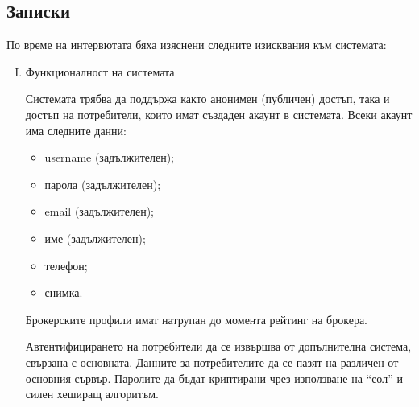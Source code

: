 \documentclass[]{article}
\begin{document}
\subsection*{Записки}
По време на интервютата бяха изяснени следните изисквания към системата:
\begin{enumerate}[I.]
\item {Функционалност на системата


Системата трябва да поддържа както анонимен (публичен) достъп, така и достъп на потребители, които имат създаден акаунт в системата. Всеки акаунт има следните данни:
	\begin{itemize}
	\item username (задължителен);
	\item парола (задължителен);
	\item email (задължителен);
	\item име (задължителен);
	\item телефон;
	\item снимка.
	\end{itemize}

Брокерските профили имат натрупан до момента рейтинг на брокера.
				
Автентифицирането на потребители да се извършва от допълнителна система, свързана с основната. Данните за потребителите да се пазят на различен от основния сървър. Паролите да бъдат криптирани чрез използване на ``сол'' и силен хеширащ алгоритъм. 

}
\end{enumerate}
\end{document}
